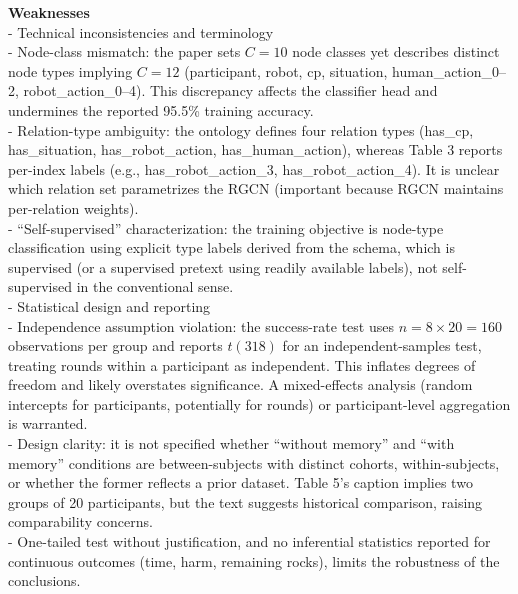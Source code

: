 \documentclass[letterpaper]{article} %
\begin{document}
\textbf{Weaknesses}\\
- Technical inconsistencies and terminology\\
\hspace*{1em}- Node-class mismatch: the paper sets $C=10$ node classes yet describes distinct node types implying $C=12$ (participant, robot, cp, situation, human\_action\_0–2, robot\_action\_0–4). This discrepancy affects the classifier head and undermines the reported 95.5\% training accuracy.\\
\hspace*{1em}- Relation-type ambiguity: the ontology defines four relation types (has\_cp, has\_situation, has\_robot\_action, has\_human\_action), whereas Table 3 reports per-index labels (e.g., has\_robot\_action\_3, has\_robot\_action\_4). It is unclear which relation set parametrizes the RGCN (important because RGCN maintains per-relation weights).\\
\hspace*{1em}- “Self-supervised” characterization: the training objective is node-type classification using explicit type labels derived from the schema, which is supervised (or a supervised pretext using readily available labels), not self-supervised in the conventional sense.\\[0.25em]
- Statistical design and reporting\\
\hspace*{1em}- Independence assumption violation: the success-rate test uses $n=8\times 20=160$ observations per group and reports $t(318)$ for an independent-samples test, treating rounds within a participant as independent. This inflates degrees of freedom and likely overstates significance. A mixed-effects analysis (random intercepts for participants, potentially for rounds) or participant-level aggregation is warranted.\\
\hspace*{1em}- Design clarity: it is not specified whether “without memory” and “with memory” conditions are between-subjects with distinct cohorts, within-subjects, or whether the former reflects a prior dataset. Table 5’s caption implies two groups of 20 participants, but the text suggests historical comparison, raising comparability concerns.\\
\hspace*{1em}- One-tailed test without justification, and no inferential statistics reported for continuous outcomes (time, harm, remaining rocks), limits the robustness of the conclusions.\\[0.25em]
\end{document}
